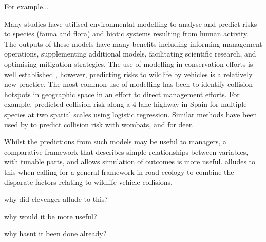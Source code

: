 For example...


Many studies have utilised environmental modelling to analyse and predict risks to species (fauna and flora) and biotic systems resulting from human activity. The outputs of these models have many benefits including informing management operations, supplementing additional models, facilitating scientific research, and optimising mitigation strategies. The use of modelling in conservation efforts is well established \citep{star86}, however, predicting risks to wildlife by vehicles is a relatively new practice. The most common use of modelling has been to identify collision hotspots in geographic space in an effort to direct management efforts. For example, \cite{malo04} predicted collision risk along a 4-lane highway in Spain for multiple species at two spatial scales using logistic regression. Similar methods have been used by \cite{roge09} to predict collision risk with wombats, and \cite{sudh09} for deer.

Whilst the predictions from such models may be useful to managers, a comparative framework that describes simple relationships between variables, with tunable parts, and allows simulation of outcomes is more useful. \cite{clev15} alludes to this when calling for a general framework in road ecology to combine the disparate factors relating to wildlife-vehicle collisions.

why did clevenger allude to this?

why would it be more useful?

why hasnt it been done already?


